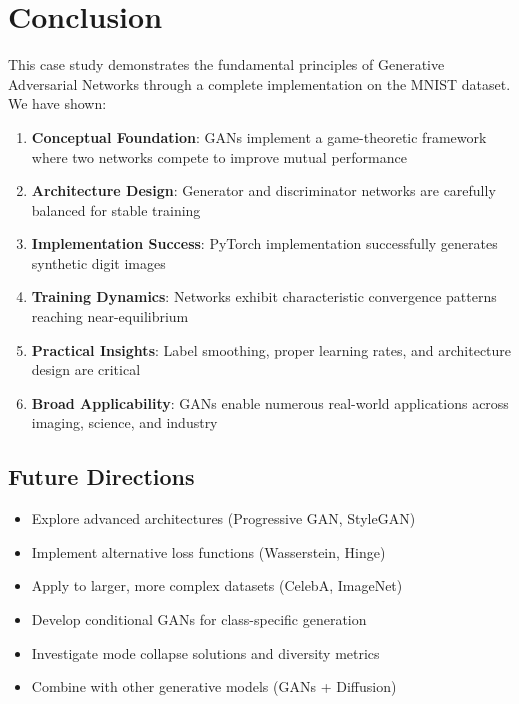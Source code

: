 \documentclass[12pt,a4paper]{article}
\begin{document}
\section{Conclusion} \label{sec:conclusion}

This case study demonstrates the fundamental principles of Generative Adversarial Networks through a complete implementation on the MNIST dataset. We have shown:

\begin{enumerate}
    \item \textbf{Conceptual Foundation}: GANs implement a game-theoretic framework where two networks compete to improve mutual performance
    \item \textbf{Architecture Design}: Generator and discriminator networks are carefully balanced for stable training
    \item \textbf{Implementation Success}: PyTorch implementation successfully generates synthetic digit images
    \item \textbf{Training Dynamics}: Networks exhibit characteristic convergence patterns reaching near-equilibrium
    \item \textbf{Practical Insights}: Label smoothing, proper learning rates, and architecture design are critical
    \item \textbf{Broad Applicability}: GANs enable numerous real-world applications across imaging, science, and industry
\end{enumerate}

\subsection{Future Directions}

\begin{itemize}
    \item Explore advanced architectures (Progressive GAN, StyleGAN)
    \item Implement alternative loss functions (Wasserstein, Hinge)
    \item Apply to larger, more complex datasets (CelebA, ImageNet)
    \item Develop conditional GANs for class-specific generation
    \item Investigate mode collapse solutions and diversity metrics
    \item Combine with other generative models (GANs + Diffusion)
\end{itemize}
\end{document}
